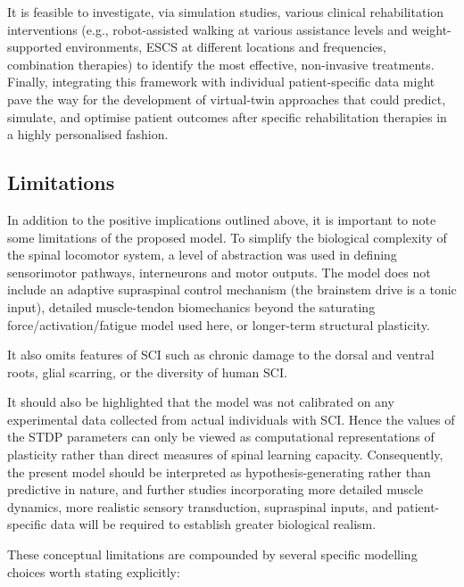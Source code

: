 It is feasible to investigate, via simulation studies, various clinical
rehabilitation interventions (e.g., robot-assisted walking at various
assistance levels and weight-supported environments, ESCS at different
locations and frequencies, combination therapies) to identify the most
effective, non-invasive treatments. Finally, integrating this framework
with individual patient-specific data might pave the way for the
development of virtual-twin approaches that could predict, simulate, and
optimise patient outcomes after specific rehabilitation therapies in a
highly personalised fashion.

\subsection{Limitations}
In addition to the positive implications outlined above, it is important
to note some limitations of the proposed model. To simplify the biological
complexity of the spinal locomotor system, a level of abstraction was used
in defining sensorimotor pathways, interneurons and motor outputs. The
model does not include an adaptive supraspinal control mechanism (the
brainstem drive is a tonic input), detailed muscle-tendon
biomechanics beyond the saturating force/activation/fatigue model used here,
or longer-term structural plasticity.

It also omits features of SCI such as chronic damage to the dorsal and
ventral roots, glial scarring, or the diversity of human SCI.

It should also be highlighted that the model was not calibrated on any
experimental data collected from actual individuals with SCI. Hence the
values of the STDP parameters can only be viewed as computational
representations of plasticity rather than direct measures of spinal
learning capacity. Consequently, the present model should be interpreted
as hypothesis-generating rather than predictive in nature, and further
studies incorporating more detailed muscle dynamics, more realistic
sensory transduction, supraspinal inputs, and patient-specific data will
be required to establish greater biological realism.

These conceptual limitations are compounded by several specific modelling
choices worth stating explicitly:

